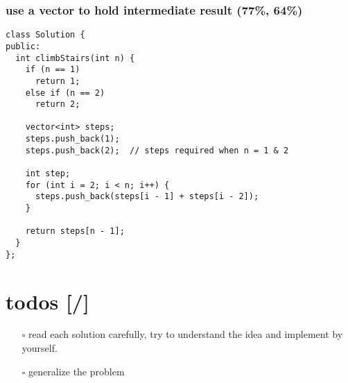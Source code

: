 \documentclass[12pt]{book}
\begin{document}
\subsubsection{use a vector to hold intermediate result (77\%, 64\%)}
\label{sec:org352bcbc}
\begin{verbatim}
class Solution {
public:
  int climbStairs(int n) {
    if (n == 1)
      return 1;
    else if (n == 2)
      return 2;

    vector<int> steps;
    steps.push_back(1);
    steps.push_back(2);  // steps required when n = 1 & 2

    int step;
    for (int i = 2; i < n; i++) {
      steps.push_back(steps[i - 1] + steps[i - 2]);
    }

    return steps[n - 1];
  }
};
\end{verbatim}

\section{todos [/]}
\label{sec:org47e7b0d}
\begin{itemize}
\item[{$\square$}] read each solution carefully, try to understand the idea and implement by yourself.
\item[{$\square$}] generalize the problem
\end{itemize}
\end{document}
